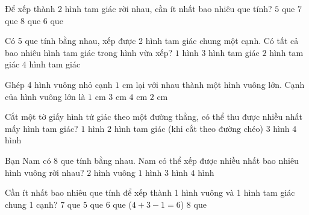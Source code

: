 \begin{ex} %
Để xếp thành 2 hình tam giác rời nhau, cần ít nhất bao nhiêu que tính?
\choice
{$5$ que}
{$7$ que}
{$8$ que}
{\True $6$ que}
\end{ex}

\begin{ex} %
Có 5 que tính bằng nhau, xếp được 2 hình tam giác chung một cạnh. Có tất cả bao nhiêu hình tam giác trong hình vừa xếp?
\choice
{$1$ hình}
{$3$ hình tam giác}
{\True $2$ hình tam giác}
{$4$ hình tam giác}
\end{ex}

\begin{ex} %
Ghép 4 hình vuông nhỏ cạnh $1\text{ cm}$ lại với nhau thành một hình vuông lớn. Cạnh của hình vuông lớn là
\choice
{$1\text{ cm}$}
{$3\text{ cm}$}
{$4\text{ cm}$}
{\True $2\text{ cm}$}
\end{ex}

\begin{ex} %
Cắt một tờ giấy hình tứ giác theo một đường thẳng, có thể thu được nhiều nhất mấy hình tam giác?
\choice
{$1$ hình}
{\True $2$ hình tam giác (khi cắt theo đường chéo)}
{$3$ hình}
{$4$ hình}
\end{ex}

\begin{ex} %
Bạn Nam có 8 que tính bằng nhau. Nam có thể xếp được nhiều nhất bao nhiêu hình vuông rời nhau?
\choice
{\True $2$ hình vuông}
{$1$ hình}
{$3$ hình}
{$4$ hình}
\end{ex}

\begin{ex} %
Cần ít nhất bao nhiêu que tính để xếp thành 1 hình vuông và 1 hình tam giác chung 1 cạnh?
\choice
{$7$ que}
{$5$ que}
{\True $6$ que ($4 + 3 - 1 = 6$)}
{$8$ que}
\end{ex}

